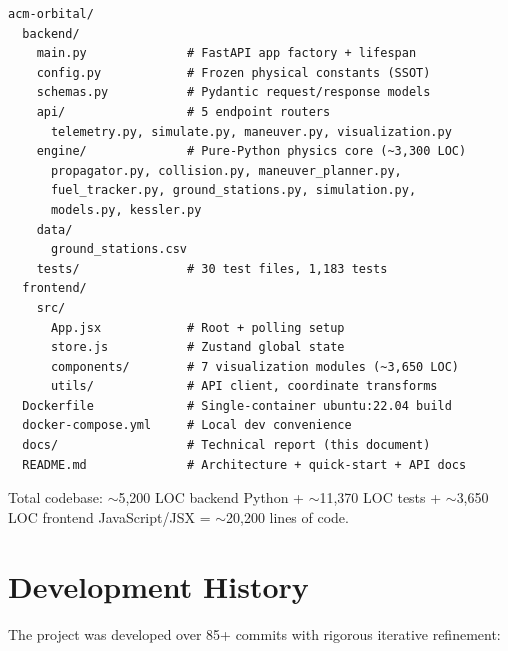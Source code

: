 \documentclass[11pt,a4paper]{article}
\begin{document}
\begin{verbatim}
acm-orbital/
  backend/
    main.py              # FastAPI app factory + lifespan
    config.py            # Frozen physical constants (SSOT)
    schemas.py           # Pydantic request/response models
    api/                 # 5 endpoint routers
      telemetry.py, simulate.py, maneuver.py, visualization.py
    engine/              # Pure-Python physics core (~3,300 LOC)
      propagator.py, collision.py, maneuver_planner.py,
      fuel_tracker.py, ground_stations.py, simulation.py,
      models.py, kessler.py
    data/
      ground_stations.csv
    tests/               # 30 test files, 1,183 tests
  frontend/
    src/
      App.jsx            # Root + polling setup
      store.js           # Zustand global state
      components/        # 7 visualization modules (~3,650 LOC)
      utils/             # API client, coordinate transforms
  Dockerfile             # Single-container ubuntu:22.04 build
  docker-compose.yml     # Local dev convenience
  docs/                  # Technical report (this document)
  README.md              # Architecture + quick-start + API docs
\end{verbatim}

Total codebase: $\sim$5,200 LOC backend Python + $\sim$11,370 LOC tests +
$\sim$3,650 LOC frontend JavaScript/JSX = $\sim$20,200 lines of code.

\section{Development History}

The project was developed over 85+ commits with rigorous iterative refinement:
\end{document}
